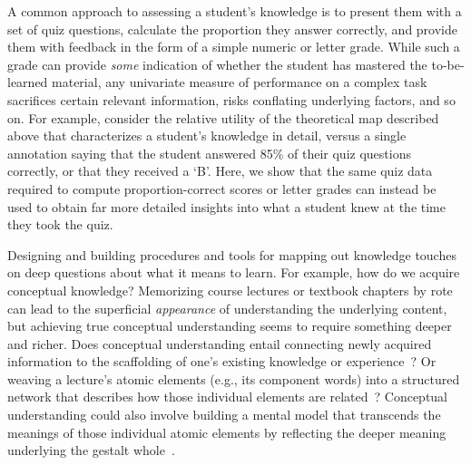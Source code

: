 \documentclass[10pt]{article}
\begin{document}
A common approach to assessing a student's knowledge is to present them with a
set of quiz questions, calculate the proportion they answer correctly, and
provide them with feedback in the form of a simple numeric or letter grade.
While such a grade can provide \textit{some} indication of whether the student
has mastered the to-be-learned material, any univariate measure of performance
on a complex task sacrifices certain relevant information, risks conflating
underlying factors, and so on. For example, consider the relative utility of
the theoretical map described above that characterizes a student's knowledge in
detail, versus a single annotation saying that the student answered 85\% of
their quiz questions correctly, or that they received a `B'. Here, we show that
the same quiz data required to compute proportion-correct scores or letter
grades can instead be used to obtain far more detailed insights into what a
student knew at the time they took the quiz.

Designing and building procedures and tools for mapping out knowledge touches
on deep questions about what it means to learn. For example, how do we acquire
conceptual knowledge? Memorizing course lectures or textbook chapters by rote
can lead to the superficial \textit{appearance} of understanding the underlying
content, but achieving true conceptual understanding seems to require something
deeper and richer. Does conceptual understanding entail connecting newly
acquired information to the scaffolding of one's existing knowledge or
experience~\citep{BlayEtal06,CaraMaho03, ConsEtal16, DeacEtal04, SimoEtal04,
HuebWill18}? Or weaving a lecture's atomic elements (e.g., its component words)
into a structured network that describes how those individual elements are
related~\citep{LeeChen22, vanPEtal21}? Conceptual understanding could also
involve building a mental model that transcends the meanings of those
individual atomic elements by reflecting the deeper meaning underlying the
gestalt whole~\citep{Kint70, Macl05, ScotEtal07, TulcEtal23}.
\end{document}
